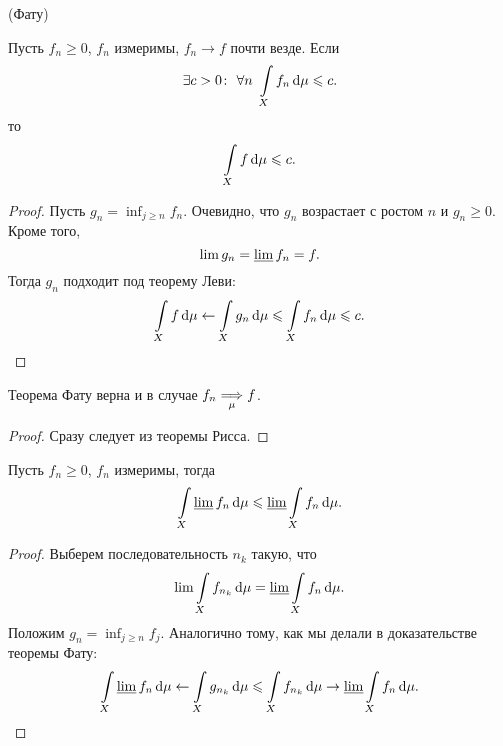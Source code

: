 \begin{theorem}(Фату)

    Пусть $f_n \geqslant 0$, $f_n$ измеримы, $f_n \to f$ почти везде. Если
    \[
        \exists c > 0\colon~ \forall n~ \int\limits_{X}{f_n \,\mathrm{d}\mu} \leqslant c
    .\] 
    то
    \[
        \int\limits_{X}{f \,\mathrm{d}\mu} \leqslant c
    .\] 
\end{theorem}
\begin{proof}
    Пусть $g_n = \inf_{j \geqslant n}{f_n}$. Очевидно, что $g_n$ возрастает с ростом $n$ и
    $g_n \geqslant 0$. Кроме того,
    \[ 
        \lim{g_n} = \varliminf{f_n} = f
    .\]
    Тогда $g_n$ подходит под теорему Леви:
    \[
        \int\limits_X{f \,\mathrm{d}\mu} \leftarrow \int\limits_X{g_n \,\mathrm{d}\mu} \leqslant \int\limits_X{f_n \,\mathrm{d}\mu} \leqslant c
    .\]
\end{proof}

\begin{corollary}

    Теорема Фату верна и в случае $f_n \underset{\mu}{\Longrightarrow} f$.
\end{corollary}
\begin{proof}
    Сразу следует из теоремы Рисса.
\end{proof}

\begin{corollary}

    Пусть $f_n \geqslant 0$, $f_n$ измеримы, тогда
    \[
        \int\limits_{X}{\varliminf{f_n} \,\mathrm{d}\mu} \leqslant \varliminf{\int\limits_{X}{f_n \,\mathrm{d}\mu}}
    .\] 
\end{corollary}
\begin{proof}
    Выберем последовательность $n_k$ такую, что
    \[
        \lim{\int\limits_X{f_{n_k} \,\mathrm{d}\mu}} = \varliminf{\int\limits_X{f_n \,\mathrm{d}\mu}}
    .\]
    Положим $g_n = \inf_{j \geqslant n}{f_j}$. Аналогично тому, как мы делали в
    доказательстве теоремы Фату:
    \[
        \int\limits_X{\varliminf{f_n} \,\mathrm{d}\mu} \leftarrow \int\limits_X{g_{n_k}\,\mathrm{d}\mu} \leqslant
        \int\limits_X{f_{n_k}\,\mathrm{d}\mu} \rightarrow \varliminf{\int\limits_X{f_n \,\mathrm{d}\mu}}
    .\]
\end{proof}

